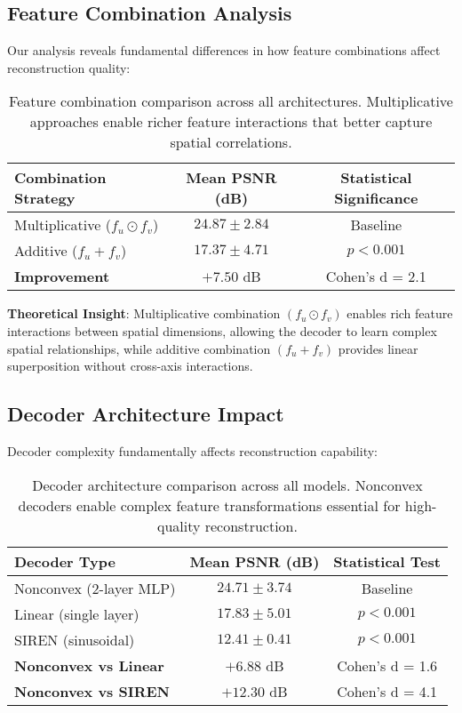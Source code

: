 \documentclass{article}
\begin{document}
\subsection{Feature Combination Analysis}

Our analysis reveals fundamental differences in how feature combinations affect reconstruction quality:

\begin{table}[t]
\centering
\small
\begin{tabular}{@{}lcc@{}}
\toprule
\textbf{Combination Strategy} & \textbf{Mean PSNR (dB)} & \textbf{Statistical Significance} \\
\midrule
Multiplicative ($f_u \odot f_v$) & $24.87 \pm 2.84$ & Baseline \\
Additive ($f_u + f_v$) & $17.37 \pm 4.71$ & $p < 0.001$ \\
\midrule
\textbf{Improvement} & $\mathbf{+7.50}$ dB & Cohen's d = 2.1 \\
\bottomrule
\end{tabular}
\caption{Feature combination comparison across all architectures. Multiplicative approaches enable richer feature interactions that better capture spatial correlations.}
\label{tab:combination_analysis}
\end{table}

\textbf{Theoretical Insight}: Multiplicative combination $(f_u \odot f_v)$ enables rich feature interactions between spatial dimensions, allowing the decoder to learn complex spatial relationships, while additive combination $(f_u + f_v)$ provides linear superposition without cross-axis interactions.

\subsection{Decoder Architecture Impact}

Decoder complexity fundamentally affects reconstruction capability:

\begin{table}[t]
\centering
\small
\begin{tabular}{@{}lcc@{}}
\toprule
\textbf{Decoder Type} & \textbf{Mean PSNR (dB)} & \textbf{Statistical Test} \\
\midrule
Nonconvex (2-layer MLP) & $24.71 \pm 3.74$ & Baseline \\
Linear (single layer) & $17.83 \pm 5.01$ & $p < 0.001$ \\
SIREN (sinusoidal) & $12.41 \pm 0.41$ & $p < 0.001$ \\
\midrule
\textbf{Nonconvex vs Linear} & $\mathbf{+6.88}$ dB & Cohen's d = 1.6 \\
\textbf{Nonconvex vs SIREN} & $\mathbf{+12.30}$ dB & Cohen's d = 4.1 \\
\bottomrule
\end{tabular}
\caption{Decoder architecture comparison across all models. Nonconvex decoders enable complex feature transformations essential for high-quality reconstruction.}
\label{tab:decoder_comparison}
\end{table}
\end{document}

